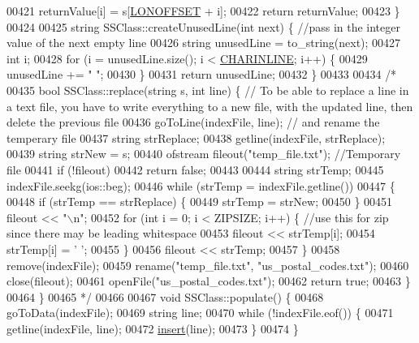 \begin{DoxyCode}
00421         returnValue[i] = s[\hyperlink{SSClass_8h_a6e916bbc2eb39605cceaee1adc47c3e3}{LONOFFSET} + i];
00422     \textcolor{keywordflow}{return} returnValue;
00423 \}
00424 
00425 \textcolor{keywordtype}{string} SSClass::createUnusedLine(\textcolor{keywordtype}{int} next) \{ \textcolor{comment}{//pass in the integer value of the next empty line}
00426     \textcolor{keywordtype}{string} unusedLine = to\_string(next);
00427     \textcolor{keywordtype}{int} i;
00428     \textcolor{keywordflow}{for} (i = unusedLine.size(); i < \hyperlink{SSClass_8h_ab9a6169c3849700398c71a392857cb9c}{CHARINLINE}; i++) \{
00429         unusedLine += \textcolor{stringliteral}{" "};
00430     \}
00431     \textcolor{keywordflow}{return} unusedLine;
00432 \}
00433 
00434 \textcolor{comment}{/*}
00435 \textcolor{comment}{bool SSClass::replace(string s, int line) \{ // To be able to replace a line in a text file, you have to
       write everything to a new file, with the updated line, then delete the previous file }
00436 \textcolor{comment}{    goToLine(indexFile, line);              // and rename the temperary file}
00437 \textcolor{comment}{    string strReplace;}
00438 \textcolor{comment}{    getline(indexFile, strReplace);}
00439 \textcolor{comment}{    string strNew = s;}
00440 \textcolor{comment}{    ofstream fileout("temp\_file.txt"); //Temporary file}
00441 \textcolor{comment}{    if (!fileout)}
00442 \textcolor{comment}{        return false;}
00443 \textcolor{comment}{}
00444 \textcolor{comment}{    string strTemp;}
00445 \textcolor{comment}{    indexFile.seekg(ios::beg);}
00446 \textcolor{comment}{    while (strTemp = indexFile.getline())}
00447 \textcolor{comment}{    \{}
00448 \textcolor{comment}{        if (strTemp == strReplace) \{}
00449 \textcolor{comment}{            strTemp = strNew;}
00450 \textcolor{comment}{        \}}
00451 \textcolor{comment}{        fileout << "\(\backslash\)n";}
00452 \textcolor{comment}{        for (int i = 0; i < ZIPSIZE; i++) \{ //use this for zip since there may be leading whitespace}
00453 \textcolor{comment}{            fileout << strTemp[i];}
00454 \textcolor{comment}{            strTemp[i] = ' ';}
00455 \textcolor{comment}{        \}}
00456 \textcolor{comment}{        fileout << strTemp;}
00457 \textcolor{comment}{    \}}
00458 \textcolor{comment}{    remove(indexFile);}
00459 \textcolor{comment}{    rename("temp\_file.txt", "us\_postal\_codes.txt");}
00460 \textcolor{comment}{    close(fileout);}
00461 \textcolor{comment}{    openFile("us\_postal\_codes.txt");}
00462 \textcolor{comment}{    return true;}
00463 \textcolor{comment}{\}}
00464 \textcolor{comment}{\}}
00465 \textcolor{comment}{*/}
00466 
00467 \textcolor{keywordtype}{void} SSClass::populate() \{
00468     goToData(indexFile);
00469     \textcolor{keywordtype}{string} line;
00470     \textcolor{keywordflow}{while} (!indexFile.eof()) \{
00471         getline(indexFile, line);
00472         \hyperlink{classSSClass_a45c5585c784bf7c4f823f66426664aea}{insert}(line);
00473     \}
00474 \}
\end{DoxyCode}
